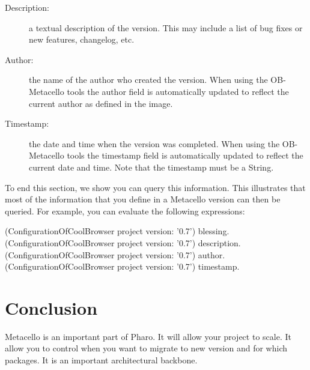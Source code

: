 \documentclass[a4paper,10pt,twoside]{book}
\begin{document}
\begin{description}

\item[ Description:] a textual description of the version. This may include a list of bug fixes or new features, changelog, etc.
\item[  Author:] the name of the author who created the version. When using the OB-Metacello tools the author field is automatically updated to reflect the current author as defined in the image.
\item[  Timestamp:] the date and time when the version was completed. When using the OB-Metacello tools the timestamp field is automatically updated to reflect the current date and time. Note that the timestamp must be a String.

\end{description}

To end this section, we show you can query this information. This illustrates that most of the information that you define in a Metacello version can then be queried. For example, you can evaluate the following expressions:

\begin{code}{}
(ConfigurationOfCoolBrowser project version: '0.7') blessing.
(ConfigurationOfCoolBrowser project version: '0.7') description.
(ConfigurationOfCoolBrowser project version: '0.7') author.
(ConfigurationOfCoolBrowser project version: '0.7') timestamp.
\end{code}


\section{Conclusion}
Metacello is an important part of Pharo. It will allow your project to scale. It allow you to control when you want to migrate to new version and for which packages. It is an important architectural backbone.


\ifx\wholebook\relax\else
   
   
\end{document}
